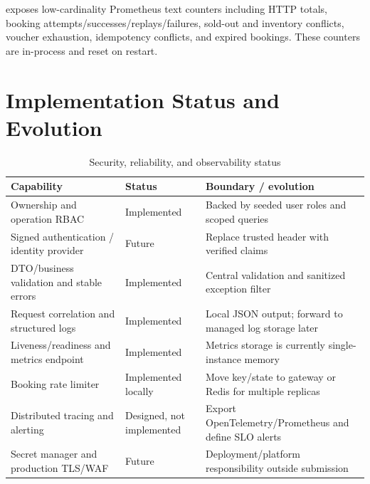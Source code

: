  exposes low-cardinality Prometheus text counters including
HTTP totals, booking attempts/successes/replays/failures, sold-out and inventory
conflicts, voucher exhaustion, idempotency conflicts, and expired bookings.
These counters are in-process and reset on restart.

\section{Implementation Status and Evolution}
\begin{table}[H]
\centering
\caption{Security, reliability, and observability status}
\begin{tabularx}{\textwidth}{p{}p{}Y}
\toprule
\textbf{Capability} & \textbf{Status} & \textbf{Boundary / evolution} \\
\midrule
Ownership and operation RBAC & Implemented & Backed by seeded user roles and scoped queries \\
Signed authentication / identity provider & Future & Replace trusted header with verified claims \\
DTO/business validation and stable errors & Implemented & Central validation and sanitized exception filter \\
Request correlation and structured logs & Implemented & Local JSON output; forward to managed log storage later \\
Liveness/readiness and metrics endpoint & Implemented & Metrics storage is currently single-instance memory \\
Booking rate limiter & Implemented locally & Move key/state to gateway or Redis for multiple replicas \\
Distributed tracing and alerting & Designed, not implemented & Export OpenTelemetry/Prometheus and define SLO alerts \\
Secret manager and production TLS/WAF & Future & Deployment/platform responsibility outside submission \\
\bottomrule
\end{tabularx}
\end{table}
